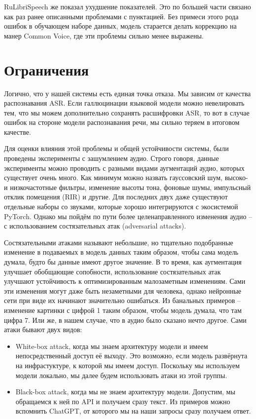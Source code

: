 RuLibriSpeech же показал ухудшение показателей.
Это по большей части связано как раз ранее описанными проблемами с пунктацией.
Без примеси этого рода ошибок в обучающем наборе данных, модель старается делать коррекцию на манер Common Voice, где эти проблемы сильно менее выражены.

\section{Ограничения}

Логично, что у нашей системы есть единая точка отказа.
Мы зависим от качества распознавания ASR.
Если галлюцинации языковой модели можно невелировать тем, что мы можем дополнительно сохранять расшифровки ASR, то вот в случае ошибок на стороне модели распознавания речи, мы сильно теряем в итоговом качестве.

Для оценки влияния этой проблемы и общей устойчивости системы, были проведены эксперименты с зашумлением аудио.
Строго говоря, данные эксперименты можно проводить с разными видами аугментаций аудио, которых существует очень много.
Как минимум можно назвать гауссовский шум, высоко- и низкочастотные фильтры, изменение высоты тона, фоновые шумы, импульсный отклик помещения (RIR) и другие.
Для последних двух даже существуют отдельные наборы со звуками, которые хорошо интегрируются с экосистемой PyTorch.
Однако мы пойдём по пути более целенаправленного изменения аудио -- с использованием состязательных атак (adversarial attacks)\cite{olivier2022recent,zhang2022adversarial,carlini2018audio}.

Состязательными атаками называют небольшие, но тщательно подобранные изменение в подаваемых в модель данных таким образом, чтобы сама модель думала, будто бы данные имеют другое значение.
В то время, как аугментация улучшает обобщающие сопобности, использование состязательных атак улучшают устойчивость к оптимизированным малозаметным изменениям.
Сами эти изменения могут даже быть незаметными для человека, однако нейронные сети при виде их начинают значительно ошибаться.
Из банальных примеров -- изменение картинки с цифрой 1 таким образом, чтобы модель думала, что там цифра 7\cite{warr2019strengthening}.
Или же, в нашем случае, что в аудио было сказано нечто другое.
Сами атаки бывают двух видов:

\begin{itemize}
  \item White-box attack, когда мы знаем архитектуру модели и имеем непосредственный доступ её выходу.
  Это возможно, если модель развёрнута на инфрастуктуре, к которой мы имеем доступ.
  Поскольку мы используем модели локально, мы далее будем использовать атаки из этой группы.
  \item Black-box attack, когда мы не знаем архитектуру модели.
  Допустим, мы обращаемся к ней по API и получаем сразу текст.
  Из примеров можно вспомнить ChatGPT, от которого мы на наши запросы сразу получаем ответ.
\end{itemize}

